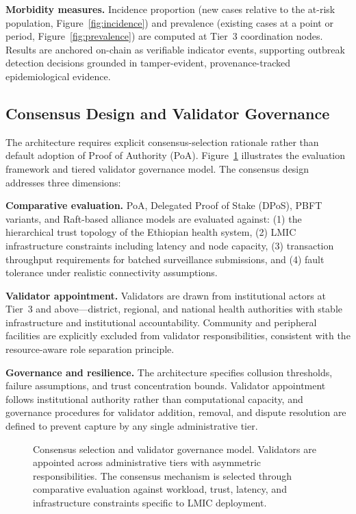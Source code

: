 \textbf{Morbidity measures.} Incidence proportion (new cases relative to the at-risk population, Figure~\ref{fig:incidence}) and prevalence (existing cases at a point or period, Figure~\ref{fig:prevalence}) are computed at Tier~3 coordination nodes.\cite{cdc2012principles} Results are anchored on-chain as verifiable indicator events, supporting outbreak detection decisions grounded in tamper-evident, provenance-tracked epidemiological evidence.

\subsection{Consensus Design and Validator Governance}\label{subsec:consensus}

The architecture requires explicit consensus-selection rationale rather than default adoption of Proof of Authority (PoA). Figure~\ref{fig:consensus} illustrates the evaluation framework and tiered validator governance model. The consensus design addresses three dimensions:

\textbf{Comparative evaluation.} PoA, Delegated Proof of Stake (DPoS), PBFT variants, and Raft-based alliance models are evaluated against: (1) the hierarchical trust topology of the Ethiopian health system, (2) LMIC infrastructure constraints including latency and node capacity, (3) transaction throughput requirements for batched surveillance submissions, and (4) fault tolerance under realistic connectivity assumptions.

\textbf{Validator appointment.} Validators are drawn from institutional actors at Tier~3 and above---district, regional, and national health authorities with stable infrastructure and institutional accountability. Community and peripheral facilities are explicitly excluded from validator responsibilities, consistent with the resource-aware role separation principle.

\textbf{Governance and resilience.} The architecture specifies collusion thresholds, failure assumptions, and trust concentration bounds. Validator appointment follows institutional authority rather than computational capacity, and governance procedures for validator addition, removal, and dispute resolution are defined to prevent capture by any single administrative tier.


\begin{figure}[!ht]
\centering
{}
\caption{Consensus selection and validator governance model. Validators are appointed across administrative tiers with asymmetric responsibilities. The consensus mechanism is selected through comparative evaluation against workload, trust, latency, and infrastructure constraints specific to LMIC deployment.}\label{fig:consensus}
\end{figure}

